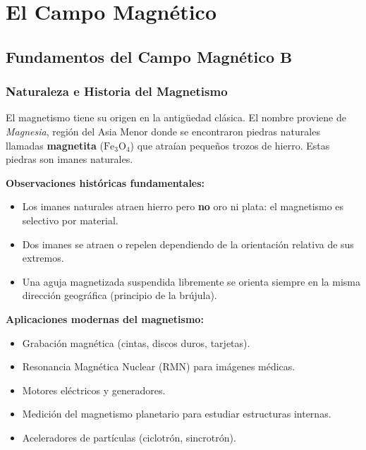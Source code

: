 \documentclass[12pt, letterpaper]{report}
\numberwithin{equation}{section}
\newcommand{\vB}[1]{\boldsymbol{#1}}          %
\begin{document}
\tableofcontents
\thispagestyle{fancy}
\clearpage

\chapter{El Campo Magnético}

\section{Fundamentos del Campo Magnético \texorpdfstring{$\vB{B}$}{B}}

\subsection{Naturaleza e Historia del Magnetismo}

El magnetismo tiene su origen en la antigüedad clásica. El nombre proviene de
\textit{Magnesia}, región del Asia Menor donde se encontraron piedras naturales
llamadas \textbf{magnetita} ($\mathrm{Fe_3O_4}$) que atraían pequeños trozos de
hierro. Estas piedras son imanes naturales.

\textbf{Observaciones históricas fundamentales:}
\begin{itemize}[leftmargin=1.8em, itemsep=2pt]
  \item Los imanes naturales atraen hierro pero \textbf{no} oro ni plata:
        el magnetismo es selectivo por material.
  \item Dos imanes se atraen o repelen dependiendo de la orientación
        relativa de sus extremos.
  \item Una aguja magnetizada suspendida libremente se orienta siempre
        en la misma dirección geográfica (principio de la brújula).
\end{itemize}

\textbf{Aplicaciones modernas del magnetismo:}
\begin{itemize}[leftmargin=1.8em, itemsep=2pt]
  \item Grabación magnética (cintas, discos duros, tarjetas).
  \item Resonancia Magnética Nuclear (RMN) para imágenes médicas.
  \item Motores eléctricos y generadores.
  \item Medición del magnetismo planetario para estudiar estructuras internas.
  \item Aceleradores de partículas (ciclotrón, sincrotrón).
\end{itemize}
\end{document}
